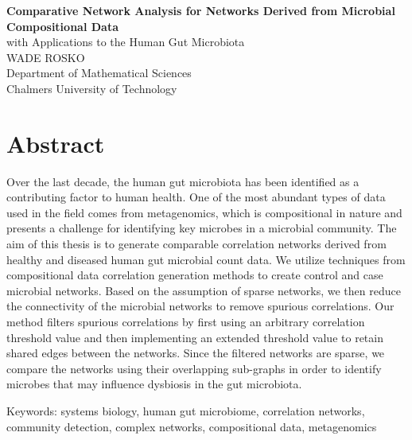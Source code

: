 
\textbf{Comparative Network Analysis for Networks Derived from Microbial Compositional Data}\\
with Applications to the Human Gut Microbiota\\
WADE ROSKO\\
Department of Mathematical Sciences\\
Chalmers University of Technology \setlength{\parskip}{0.5cm}

\thispagestyle{plain}			%
\setlength{\parskip}{0pt plus 1.0pt}
\section*{Abstract}

Over the last decade, the human gut microbiota has been identified as a contributing factor to human health. One of the most abundant types of data used in the field comes from metagenomics, which is compositional in nature and presents a challenge for identifying key microbes in a microbial community. The aim of this thesis is to generate comparable correlation networks derived from healthy and diseased human gut microbial count data. We utilize techniques from compositional data correlation generation methods to create control and case microbial networks. Based on the assumption of sparse networks, we then reduce the connectivity of the microbial networks to remove spurious correlations. Our method filters spurious correlations by first using an arbitrary correlation threshold value and then implementing an extended threshold value to retain shared edges between the networks. Since the filtered networks are sparse, we compare the networks using their overlapping sub-graphs in order to identify microbes that may influence dysbiosis in the gut microbiota. 



\vfill
Keywords: systems biology, human gut microbiome, correlation networks, community detection, complex networks, compositional data, metagenomics

\newpage				%
\thispagestyle{empty}
\mbox{}
